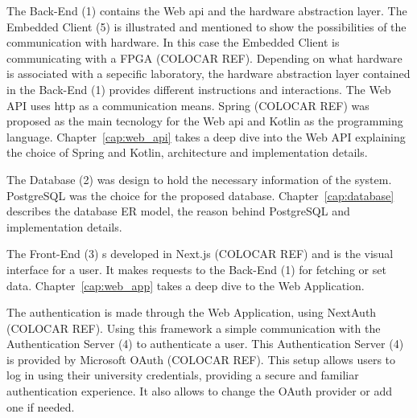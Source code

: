 The Back-End (1) contains the Web \acs{api} and the hardware abstraction layer. The Embedded Client (5) is illustrated and mentioned to show the possibilities of the communication with hardware. In this case the Embedded Client is communicating with a FPGA (COLOCAR REF). Depending on what hardware is associated with a sepecific laboratory, the hardware abstraction layer contained in the Back-End (1) provides different instructions and interactions. The Web API uses \acf{http} as a communication means. Spring (COLOCAR REF) was proposed as the main tecnology for the Web \acs{api} and Kotlin as the programming language. Chapter~\ref{cap:web_api} takes a deep dive into the Web API explaining the choice of Spring and Kotlin, architecture and implementation details. 

The Database (2) was design to hold the necessary information of the system. PostgreSQL was the choice for the proposed database. Chapter~\ref{cap:database} describes the database ER model, the reason behind PostgreSQL and implementation details.

The Front-End (3) s developed in Next.js (COLOCAR REF) and is the visual interface for a user. It makes requests to the Back-End (1) for fetching or set data. Chapter~\ref{cap:web_app} takes a deep dive to the Web Application.

The authentication is made through the Web Application, using NextAuth (COLOCAR REF). Using this framework a simple communication with the Authentication Server (4) to authenticate a user. This Authentication Server (4) is provided by Microsoft OAuth (COLOCAR REF). This setup allows users to log in using their university credentials, providing a secure and familiar authentication experience. It also allows to change the OAuth provider or add one if needed.

